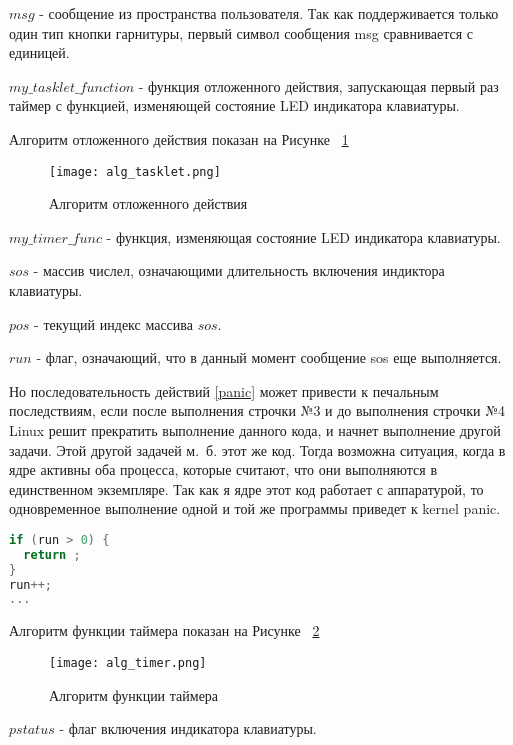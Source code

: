 $msg$ - сообщение из пространства пользователя. Так как поддерживается только один тип кнопки гарнитуры, первый символ сообщения msg сравнивается с единицей.

$my\_tasklet\_function$ - функция отложенного действия, запускающая первый раз таймер с функцией, изменяющей состояние LED индикатора клавиатуры.

Алгоритм отложенного действия показан на Рисунке ~\ref{image:alg_tasklet}

\begin{figure}[h]
  \centering
  \texttt{[image: alg\_tasklet.png]}
  \caption{Алгоритм отложенного действия}
  \label{image:alg_tasklet}
\end{figure}

$my\_timer\_func$ - функция, изменяющая состояние LED индикатора клавиатуры.

$sos$ - массив числел, означающими длительность включения индиктора клавиатуры.

$pos$ - текущий индекс массива $sos$.

$run$ - флаг, означающий, что в данный момент сообщение sos еще выполняется.

Но последовательность действий \ref{panic} может привести к печальным последствиям, если после выполнения строчки №3 и до выполнения строчки №4 Linux решит прекратить выполнение данного кода, и начнет выполнение другой задачи. Этой другой задачей м.~б. этот же код. Тогда возможна ситуация, когда в ядре активны оба процесса, которые считают, что они выполняются в единственном экземпляре. Так как я ядре этот код работает с аппаратурой, то одновременное выполнение одной и той же программы приведет к kernel panic. 

\begin{lstlisting}[language=C,caption={Опасный код},label=panic]
if (run > 0) {
  return ;
}
run++;
...
\end{lstlisting}

Алгоритм функции таймера показан на Рисунке ~\ref{image:alg_timer}

\begin{figure}[h]
  \centering
  \texttt{[image: alg\_timer.png]}
  \caption{Алгоритм функции таймера}
  \label{image:alg_timer}
\end{figure}

$pstatus$ - флаг включения индикатора клавиатуры.



